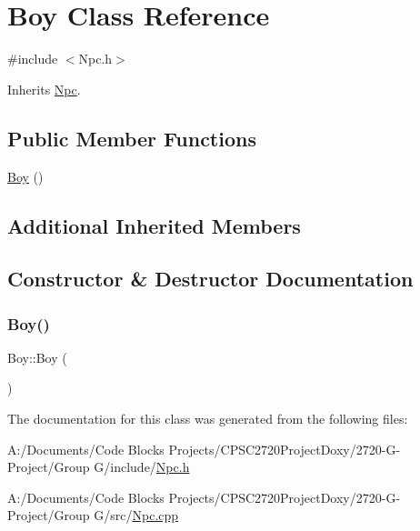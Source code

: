 \hypertarget{class_boy}{}\section{Boy Class Reference}
\label{class_boy}


{\ttfamily \#include $<$Npc.\+h$>$}



Inherits \mbox{\hyperlink{class_npc}{Npc}}.

\subsection*{Public Member Functions}
\begin{DoxyCompactItemize}
\item 
\mbox{\hyperlink{class_boy_abf3fa0c595a477813bf10ca6e665d3d3}{Boy}} ()
\end{DoxyCompactItemize}
\subsection*{Additional Inherited Members}


\subsection{Constructor \& Destructor Documentation}
\mbox{\label{class_boy_abf3fa0c595a477813bf10ca6e665d3d3}} 
\subsubsection{\texorpdfstring{Boy()}{Boy()}}
{\footnotesize\ttfamily Boy\+::\+Boy (\begin{DoxyParamCaption}{ }\end{DoxyParamCaption})}



The documentation for this class was generated from the following files\+:\begin{DoxyCompactItemize}
\item 
A\+:/\+Documents/\+Code Blocks Projects/\+C\+P\+S\+C2720\+Project\+Doxy/2720-\/\+G-\/\+Project/\+Group G/include/\mbox{\hyperlink{_npc_8h}{Npc.\+h}}\item 
A\+:/\+Documents/\+Code Blocks Projects/\+C\+P\+S\+C2720\+Project\+Doxy/2720-\/\+G-\/\+Project/\+Group G/src/\mbox{\hyperlink{_npc_8cpp}{Npc.\+cpp}}\end{DoxyCompactItemize}

